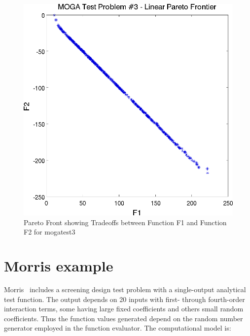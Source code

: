 \begin{figure}
  \centering
  \includegraphics[scale=0.75]{images/dakota_mogatest3_pareto_front}
  \caption{Pareto Front showing Tradeoffs between Function F1 and
    Function F2 for mogatest3}
  \label{additional:moga3front}
\end{figure}

\section{Morris example}\label{additional:morris}

Morris~\cite{Mor91} includes a screening design test problem with a
single-output analytical test function.  The output depends on 20
inputs with first- through fourth-order interaction terms, some having
large fixed coefficients and others small random coefficients.  Thus
the function values generated depend on the random number generator
employed in the function evaluator.  The computational model is:

